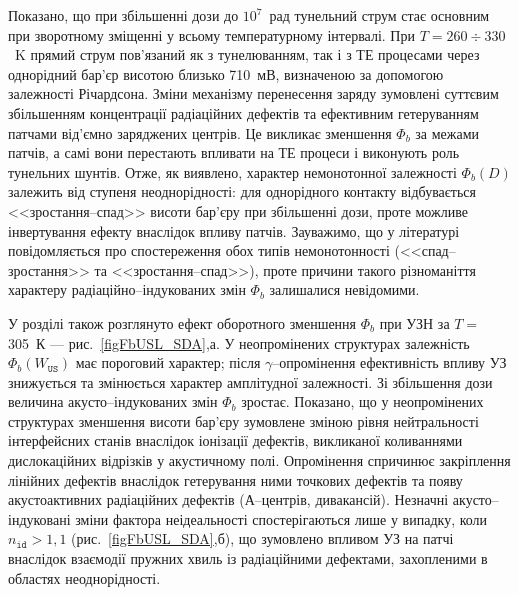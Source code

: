 Показано, що
при збільшенні дози до $10^7$~рад тунельний струм стає основним
при зворотному зміщенні у всьому температурному інтервалі.
При $T=260\div330$~K прямий струм пов'язаний як з тунелюванням, так і з ТЕ процесами через однорідний бар'єр
висотою близько 710~мВ, визначеною за допомогою залежності Річардсона.
Зміни механізму перенесення заряду зумовлені суттєвим збільшенням концентрації радіаційних дефектів
та ефективним гетеруванням патчами від'ємно заряджених центрів.
Це викликає  зменшення $\Phi_b$ за межами патчів, а самі вони перестають впливати на ТЕ процеси
і виконують роль тунельних шунтів.
Отже, як виявлено, характер немонотонної залежності $\Phi_b(D)$ залежить від ступеня неоднорідності:
для однорідного контакту відбувається <<зростання--спад>> висоти бар'єру при збільшенні дози, проте
можливе інвертування ефекту внаслідок впливу патчів.
Зауважимо, що у літературі повідомляється про спостереження обох типів немонотонності (<<спад--зростання>>
та <<зростання--спад>>),
проте причини такого різноманіття характеру радіаційно--індукованих змін $\Phi_b$ залишалися невідомими.

У розділі також розглянуто ефект оборотного зменшення $\Phi_b$ при
УЗН за $T\!=$305~К --- рис.~\ref{figFbUSL_SDA},а.
У неопромінених структурах залежність $\Phi_b(W_\mathtt{US})$ має пороговий характер;
після $\gamma$--опромінення ефективність впливу УЗ знижується та змінюється характер амплітудної залежності.
Зі збільшення дози величина акусто--індукованих змін $\Phi_b$ зростає.
Показано, що у неопромінених структурах зменшення висоти бар'єру зумовлене зміною рівня нейтральності інтерфейсних станів
внаслідок іонізації дефектів, викликаної коливаннями дислокаційних відрізків у акустичному полі.
Опромінення спричинює закріплення лінійних дефектів внаслідок гетерування ними точкових дефектів та
появу акустоактивних радіаційних дефектів (А--центрів, дивакансій).
Незначні акусто--індуковані зміни фактора неідеальності спостерігаються лише у випадку, коли $n_\mathtt{id}>1,1$ (рис.~\ref{figFbUSL_SDA},б),
що зумовлено впливом УЗ на патчі внаслідок взаємодії пружних хвиль із радіаційними дефектами, захопленими в областях неоднорідності.


